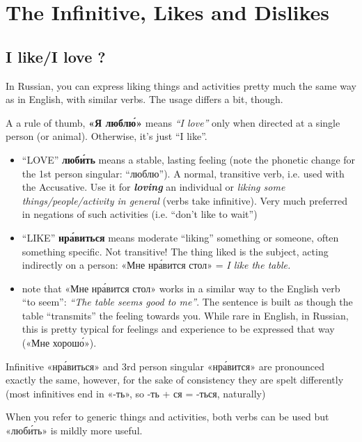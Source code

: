 \chapter{The Infinitive, Likes and
Dislikes}\label{the-infinitive-likes-and-dislikes}

\section{I like/I love ?}\label{i-likei-love}

In Russian, you can express liking things and activities pretty much the
same way as in English, with similar verbs. The usage differs a bit,
though.

A a rule of thumb, \textbf{«Я любл\'{ю}»} means \emph{``I love''} only when
directed at a single person (or animal). Otherwise, it's just ``I
like''.

\begin{itemize}
\item
  ``LOVE'' \textbf{люб\'{и}ть} means a stable, lasting feeling (note the
  phonetic change for the 1st person singular: ``люблю''). A normal,
  transitive verb, i.e. used with the Accusative. Use it for
  \textbf{\emph{loving}} an individual or \emph{liking some
  things/people/activity in general} (verbs take infinitive). Very much
  preferred in negations of such activities (i.e. ``don't like to
  wait'')
\item
  ``LIKE'' \textbf{нр\'{а}виться} means moderate ``liking'' something or
  someone, often something specific. Not transitive! The thing liked is
  the subject, acting indirectly on a person: «Мне нр\'{а}вится стол» =
  \emph{I like the table.}
\item
  note that «Мне нр\'{а}вится стол» works in a similar way to the English
  verb ``to seem'': \emph{``The table seems good to me''}. The sentence
  is built as though the table ``transmits'' the feeling towards you.
  While rare in English, in Russian, this is pretty typical for feelings
  and experience to be expressed that way («Мне хорош\'{о}»).
\end{itemize}

Infinitive «нр\'{а}виться» and 3rd person singular «нр\'{а}вится» are pronounced
exactly the same, however, for the sake of consistency they are spelt
differently (most infinitives end in «-ть», so -ть + ся = -ться,
naturally)

When you refer to generic things and activities, both verbs can be used
but «люб\'{и}ть» is mildly more useful.

